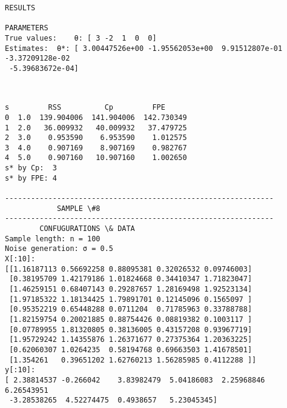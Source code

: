 \documentclass[11pt]{article}
\begin{document}
\begin{Verbatim}[commandchars=\\\{\}]
			RESULTS

PARAMETERS
True values:	θ: [ 3 -2  1  0  0]
Estimates:	θ*: [ 3.00447526e+00 -1.95562053e+00  9.91512807e-01 -3.37209128e-02
 -5.39683672e-04]

    \end{Verbatim}

    \begin{center}
    \end{center}
    { \hspace*{\fill} \\}
    
    \begin{Verbatim}[commandchars=\\\{\}]
     s         RSS          Cp         FPE
0  1.0  139.904006  141.904006  142.730349
1  2.0   36.009932   40.009932   37.479725
2  3.0    0.953590    6.953590    1.012575
3  4.0    0.907169    8.907169    0.982767
4  5.0    0.907160   10.907160    1.002650
s* by Cp:  3
s* by FPE: 4

--------------------------------------------------------------
			SAMPLE \#8
--------------------------------------------------------------
		CONFUGURATIONS \& DATA
Sample length: n = 100
Noise generation: σ = 0.5
X[:10]:
[[1.16187113 0.56692258 0.88095381 0.32026532 0.09746003]
 [0.38195709 1.42179186 1.01824668 0.34410347 1.71823047]
 [1.46259151 0.68407143 0.29287657 1.28169498 1.92523134]
 [1.97185322 1.18134425 1.79891701 0.12145096 0.1565097 ]
 [0.95352219 0.65448288 0.0711204  0.71785963 0.33788788]
 [1.82159754 0.20021885 0.88754426 0.08819382 0.1003117 ]
 [0.07789955 1.81320805 0.38136005 0.43157208 0.93967719]
 [1.95729242 1.14355876 1.26371677 0.27375364 1.20363225]
 [0.62060307 1.0264235  0.58194768 0.69663503 1.41678501]
 [1.354261   0.39651202 1.62760213 1.56285985 0.4112288 ]]
y[:10]:
[ 2.38814537 -0.266042    3.83982479  5.04186083  2.25968846  6.26543951
 -3.28538265  4.52274475  0.4938657   5.23045345]


\end{Verbatim}
\end{document}
